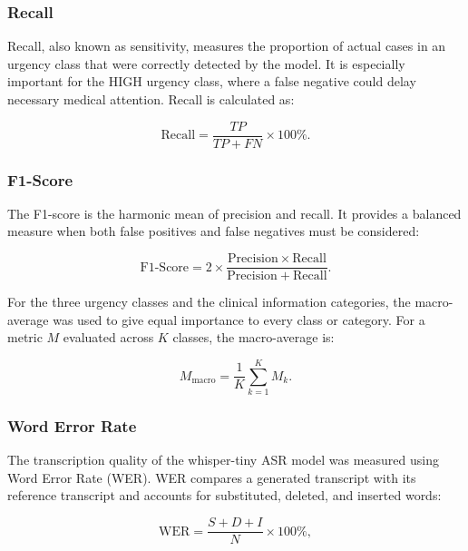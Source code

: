 \subsubsection{Recall}
Recall, also known as sensitivity, measures the proportion of actual cases in an urgency class that were correctly detected by the model. It is especially important for the HIGH urgency class, where a false negative could delay necessary medical attention. Recall is calculated as:

\begin{equation}
    \mathrm{Recall} = \frac{TP}{TP + FN} \times 100\%.
    \label{eq:recall}
\end{equation}

\subsubsection{F1-Score}
The F1-score is the harmonic mean of precision and recall. It provides a balanced measure when both false positives and false negatives must be considered:

\begin{equation}
    \mathrm{F1\text{-}Score} = 2 \times \frac{\mathrm{Precision} \times \mathrm{Recall}}{\mathrm{Precision} + \mathrm{Recall}}.
    \label{eq:f1_score}
\end{equation}

For the three urgency classes and the clinical information categories, the macro-average was used to give equal importance to every class or category. For a metric $M$ evaluated across $K$ classes, the macro-average is:

\begin{equation}
    M_{\mathrm{macro}} = \frac{1}{K}\sum_{k=1}^{K} M_k.
    \label{eq:macro_average}
\end{equation}

\subsubsection{Word Error Rate}
The transcription quality of the whisper-tiny ASR model was measured using Word Error Rate (WER). WER compares a generated transcript with its reference transcript and accounts for substituted, deleted, and inserted words:

\begin{equation}
    \mathrm{WER} = \frac{S + D + I}{N} \times 100\%,
    \label{eq:wer}
\end{equation}

